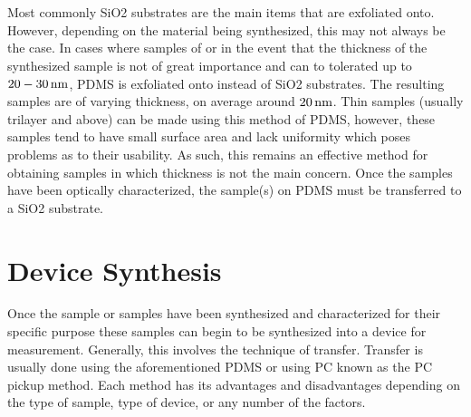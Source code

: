 \\ \\
\noindent Most commonly \acs{SiO2} substrates are the main items that are exfoliated onto. However, depending on the material being synthesized, this may not always be the case. In cases where samples of \hbn or in the event that the thickness of the synthesized sample is not of great importance and can to tolerated up to $20-30\,\mathrm{nm}$, \ac{PDMS} is exfoliated onto instead of \acs{SiO2} substrates. The resulting samples are of varying thickness, on average around $20\,\mathrm{nm}$. Thin samples (usually trilayer and above) can be made using this method of \acs{PDMS}, however, these samples tend to have small surface area and lack uniformity which poses problems as to their usability. As such, this remains an effective method for obtaining samples in which thickness is not the main concern. Once the samples have been optically characterized, the sample(s) on \acs{PDMS} must be transferred to a \acs{SiO2} substrate.

\section{Device Synthesis}\label{sec:synthesis}
Once the sample or samples have been synthesized and characterized for their specific purpose these samples can begin to be synthesized into a device for measurement. Generally, this involves the technique of transfer. Transfer is usually done using the aforementioned \acs{PDMS} or using \ac{PC} known as the \acs{PC} pickup method. Each method has its advantages and disadvantages depending on the type of sample, type of device, or any number of the factors.
%
